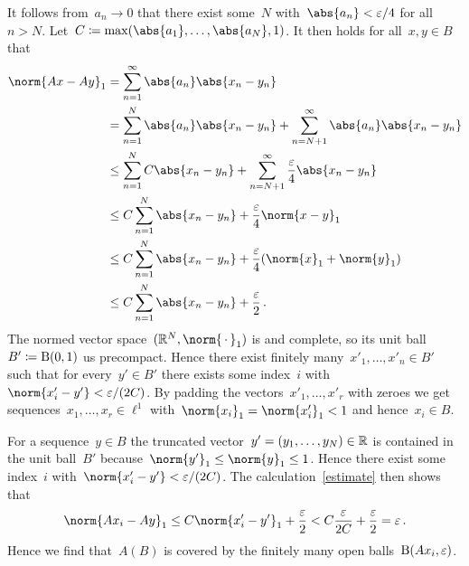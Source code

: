 It follows from~$a_n \to 0$ that there exist some~$N$ with~$\abs{a_n} < \varepsilon/4$ for all~$n > N$.
Let~$C \defined \max(\abs{a_1}, \dotsc, \abs{a_N}, 1)$.
It then holds for all~$x, y \in B$ that
\begin{equation}
  \label{estimate}
  \begin{aligned}
          \norm{Ax - Ay}_1
    &=    \sum_{n=1}^\infty \abs{a_n} \abs{x_n-y_n} \\
    &=      \sum_{n=1}^N \abs{a_n} \abs{x_n - y_n}
          + \sum_{n=N+1}^\infty \abs{a_n} \abs{x_n - y_n} \\
    &\leq   \sum_{n=1}^N C \abs{x_n - y_n}
          + \sum_{n=N+1}^\infty \frac{\varepsilon}{4} \abs{x_n - y_n} \\
    &\leq   C \sum_{n=1}^N \abs{x_n - y_n}
          + \frac{\varepsilon}{4} \norm{x-y}_1  \\
    &\leq   C \sum_{n=1}^N \abs{x_n - y_n}
          + \frac{\varepsilon}{4} (\norm{x}_1 + \norm{y}_1) \\
    &\leq   C \sum_{n=1}^N \abs{x_n - y_n}
          + \frac{\varepsilon}{2} \,.
  \end{aligned}
\end{equation}
The normed vector space~$(\Real^N, \norm{\,\cdot\,}_1)$ is  and complete, so its unit ball~$B' \defined \ball{1}{0}$ us precompact.
Hence there exist finitely many~$x'_1, \dotsc, x'_n \in B'$ such that for every~$y' \in B'$ there exists some index~$i$ with~$\norm{x'_i - y'} < \varepsilon/(2C)$.
By padding the vectors~$x'_1, \dotsc, x'_r$ with zeroes we get sequences~$x_1, \dotsc, x_r \in \ell^1$ with~$\norm{x_i}_1 = \norm{x'_i}_1 < 1$ and hence~$x_i \in B$.

For a sequence~$y \in B$ the truncated vector~$y' = (y_1, \dotsc, y_N) \in \Real$ is contained in the unit ball~$B'$ because~$\norm{y'}_1 \leq \norm{y}_1 \leq 1$.
Hence there exist some index~$i$ with~$\norm{x'_i - y'} < \varepsilon/(2C)$.
The calculation~\eqref{estimate} then shows that
\[
        \norm{A x_i - A y}_1
  \leq  C \norm{x'_i - y'}_1 + \frac{\varepsilon}{2}
  <     C \frac{\varepsilon}{2C} + \frac{\varepsilon}{2}
  =     \varepsilon \,.
\]
Hence we find that~$A(B)$ is covered by the finitely many open balls~$\ball{\varepsilon}{Ax_i}$.




